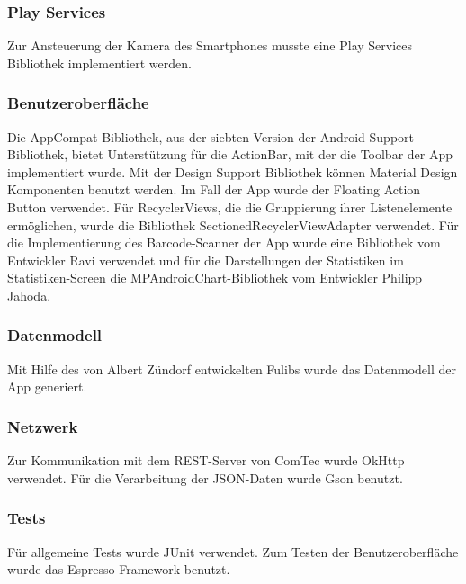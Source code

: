 \subsubsection{Play Services} \label{subsubsec:play-service-libraries}
Zur Ansteuerung der Kamera des Smartphones musste eine Play Services Bibliothek implementiert werden.

\subsubsection{Benutzeroberfläche} \label{subsubsec:ui-libraries}
Die AppCompat Bibliothek, aus der siebten Version der Android Support Bibliothek, bietet Unterstützung für die ActionBar, mit der die Toolbar der App implementiert wurde.
Mit der Design Support Bibliothek können Material Design Komponenten benutzt werden.
Im Fall der App wurde der Floating Action Button verwendet.
Für RecyclerViews, die die Gruppierung ihrer Listenelemente ermöglichen, wurde die Bibliothek SectionedRecyclerViewAdapter verwendet.
Für die Implementierung des Barcode-Scanner der App wurde eine Bibliothek vom Entwickler Ravi verwendet und für die Darstellungen der Statistiken im Statistiken-Screen die MPAndroidChart-Bibliothek vom Entwickler Philipp Jahoda.

\subsubsection{Datenmodell} \label{subsubsec:model-libraries}
Mit Hilfe des von Albert Zündorf entwickelten Fulibs wurde das Datenmodell der App generiert.

\subsubsection{Netzwerk} \label{subsubsec:network-libraries}
Zur Kommunikation mit dem REST-Server von ComTec wurde OkHttp verwendet.
Für die Verarbeitung der JSON-Daten wurde Gson benutzt.

\subsubsection{Tests} \label{subsubsec:tests-libraries}
Für allgemeine Tests wurde JUnit verwendet.
Zum Testen der Benutzeroberfläche wurde das Espresso-Framework benutzt.
